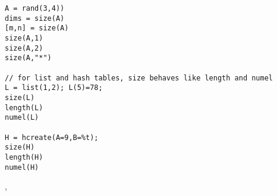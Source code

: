 \begin{examples}
\begin{Verbatim}
A = rand(3,4))
dims = size(A)
[m,n] = size(A)
size(A,1)
size(A,2)
size(A,"*")

// for list and hash tables, size behaves like length and numel
L = list(1,2); L(5)=78; 
size(L)
length(L)
numel(L)

H = hcreate(A=9,B=%t);
size(H)
length(H)
numel(H)
\end{Verbatim}
\end{examples}

\begin{manseealso}
  ,  
\end{manseealso}

